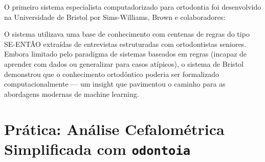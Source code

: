 O primeiro sistema especialista computadorizado para ortodontia foi desenvolvido na Universidade de Bristol por Sims-Williams, Brown e colaboradores:


O sistema utilizava uma base de conhecimento com centenas de regras do tipo SE-ENTÃO extraídas de entrevistas estruturadas com ortodontistas seniores. Embora limitado pelo paradigma de sistemas baseados em regras (incapaz de aprender com dados ou generalizar para casos atípicos), o sistema de Bristol demonstrou que o conhecimento ortodôntico poderia ser formalizado computacionalmente --- um insight que pavimentou o caminho para as abordagens modernas de machine learning.

\section{Prática: Análise Cefalométrica Simplificada com \texttt{odontoia}}

